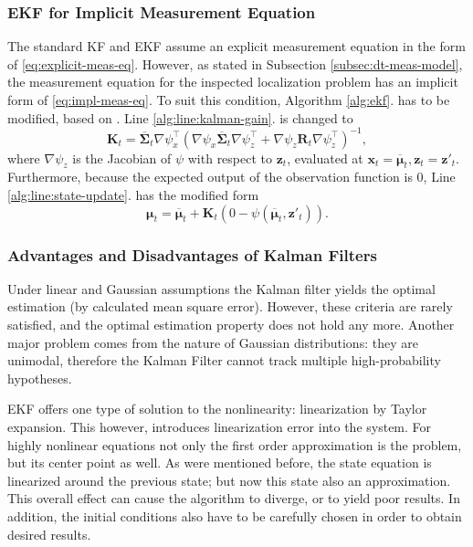 \subsubsection{EKF for Implicit Measurement Equation}

The standard KF and EKF assume an explicit measurement equation in the form of \eqref{eq:explicit-meas-eq}.
However, as stated in Subsection \ref{subsec:dt-meas-model}, the measurement equation for the inspected
localization problem has an implicit form of \eqref{eq:impl-meas-eq}.
To suit this condition, Algorithm \ref{alg:ekf}. has to be modified, based on \cite{Steffen2013,Zhang2012}.
Line \ref{alg:line:kalman-gain}. is changed to
\begin{equation}
    \mathbf{K}_t = \overline{\mathbf{\Sigma}}_t\nabla \psi_x^\top\left(\nabla \psi_x\overline{\mathbf{\Sigma}}_t\nabla \psi_z^\top+
    \nabla \psi_z\mathbf{R}_t\nabla \psi^{\top}_z\right)^{-1},
\end{equation}
where $\nabla \psi_z$ is the Jacobian of $\psi$ with respect to $\mathbf{z}_t$, evaluated at
$\mathbf{x}_t = \overline{\boldsymbol{\mu}}_t, \mathbf{z}_t = \mathbf{z}'_t$.
Furthermore, because the expected output of the observation function is 0, Line \ref{alg:line:state-update}. has the modified form
\begin{equation}
    \boldsymbol{\mu}_t = \overline{\boldsymbol{\mu}}_t + \mathbf{K}_t\left(0-\psi(\overline{\boldsymbol{\mu}}_t,\mathbf{z}'_t)\right).
\end{equation}
\subsubsection{Advantages and Disadvantages of Kalman Filters}

Under linear and Gaussian assumptions the Kalman filter yields the optimal estimation (by calculated mean square error). However, these criteria are rarely satisfied, and the optimal estimation property does not hold any more. Another major problem comes from the nature of Gaussian distributions: they are unimodal, therefore the Kalman Filter cannot track multiple high-probability hypotheses.

EKF offers one type of solution to the nonlinearity: linearization by Taylor expansion. This however, introduces linearization error into the system. For highly nonlinear equations not only the first order approximation is the problem, but its center point as well. As were mentioned before, the state equation is linearized around the previous state; but now this state also an approximation. This overall effect can cause the algorithm to diverge, or to yield poor results. In addition, the initial conditions also have to be carefully chosen in order to obtain desired results.


